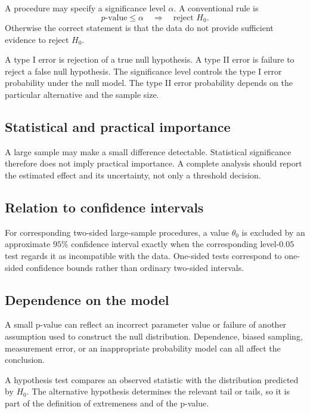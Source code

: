 A procedure may specify a significance level \(\alpha\). A conventional rule is
\[
p\text{-value}\leq\alpha
\quad\Longrightarrow\quad
\text{reject }H_0.
\]
Otherwise the correct statement is that the data do not provide sufficient
evidence to reject \(H_0\).

A type I error is rejection of a true null hypothesis. A type II error is failure
to reject a false null hypothesis. The significance level controls the type I
error probability under the null model. The type II error probability depends on
the particular alternative and the sample size.

\subsection*{Statistical and practical importance}

A large sample may make a small difference detectable. Statistical significance
therefore does not imply practical importance. A complete analysis should report
the estimated effect and its uncertainty, not only a threshold decision.

\subsection*{Relation to confidence intervals}

For corresponding two-sided large-sample procedures, a value \(\theta_0\) is
excluded by an approximate \(95\%\) confidence interval exactly when the
corresponding level-\(0.05\) test regards it as incompatible with the data.
One-sided tests correspond to one-sided confidence bounds rather than ordinary
two-sided intervals.

\subsection*{Dependence on the model}

A small p-value can reflect an incorrect parameter value or failure of another
assumption used to construct the null distribution. Dependence, biased sampling,
measurement error, or an inappropriate probability model can all affect the
conclusion.

\begin{summarybox}
A hypothesis test compares an observed statistic with the distribution predicted
by \(H_0\). The alternative hypothesis determines the relevant tail or tails, so
it is part of the definition of extremeness and of the p-value.
\end{summarybox}
